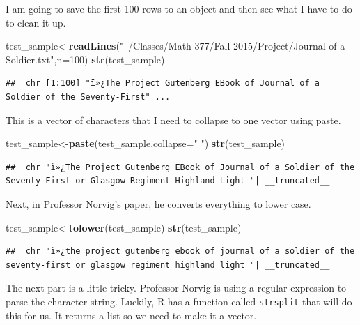 \documentclass[]{book}
\newenvironment{Shaded}{\begin{snugshade}}{\end{snugshade}}
\newcommand{\KeywordTok}[1]{\textcolor[rgb]{0.13,0.29,0.53}{\textbf{#1}}}
\newcommand{\DataTypeTok}[1]{\textcolor[rgb]{0.13,0.29,0.53}{#1}}
\newcommand{\DecValTok}[1]{\textcolor[rgb]{0.00,0.00,0.81}{#1}}
\newcommand{\StringTok}[1]{\textcolor[rgb]{0.31,0.60,0.02}{#1}}
\newcommand{\NormalTok}[1]{#1}
\theoremstyle{definition}
\theoremstyle{definition}
\theoremstyle{definition}
\theoremstyle{remark}
\begin{document}
I am going to save the first 100 rows to an object and then see what I
have to do to clean it up.

\begin{Shaded}
\begin{Highlighting}[]
\NormalTok{test_sample<-}\KeywordTok{readLines}\NormalTok{(}\StringTok{"~/Classes/Math 377/Fall 2015/Project/Journal of a Soldier.txt"}\NormalTok{,}\DataTypeTok{n=}\DecValTok{100}\NormalTok{)}
\KeywordTok{str}\NormalTok{(test_sample)}
\end{Highlighting}
\end{Shaded}

\begin{verbatim}
##  chr [1:100] "ï»¿The Project Gutenberg EBook of Journal of a Soldier of the Seventy-First" ...
\end{verbatim}

This is a vector of characters that I need to collapse to one vector
using paste.

\begin{Shaded}
\begin{Highlighting}[]
\NormalTok{test_sample<-}\KeywordTok{paste}\NormalTok{(test_sample,}\DataTypeTok{collapse=}\StringTok{" "}\NormalTok{)}
\KeywordTok{str}\NormalTok{(test_sample)}
\end{Highlighting}
\end{Shaded}

\begin{verbatim}
##  chr "ï»¿The Project Gutenberg EBook of Journal of a Soldier of the Seventy-First or Glasgow Regiment Highland Light "| __truncated__
\end{verbatim}

Next, in Professor Norvig's paper, he converts everything to lower case.

\begin{Shaded}
\begin{Highlighting}[]
\NormalTok{test_sample<-}\KeywordTok{tolower}\NormalTok{(test_sample)}
\KeywordTok{str}\NormalTok{(test_sample)}
\end{Highlighting}
\end{Shaded}

\begin{verbatim}
##  chr "ï»¿the project gutenberg ebook of journal of a soldier of the seventy-first or glasgow regiment highland light "| __truncated__
\end{verbatim}

The next part is a little tricky. Professor Norvig is using a regular
expression to parse the character string. Luckily, R has a function
called \texttt{strsplit} that will do this for us. It returns a list so
we need to make it a vector.
\end{document}
